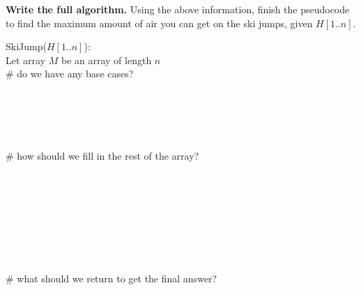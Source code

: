 \documentclass[11pt]{article}
\begin{document}
\begin{enumerate}
\begin{enumerate}
    \textbf{Write the full algorithm.} Using the above information, finish the pseudocode
    to find the maximum amount of air you can get on the ski jumps,
    given $H[1..n]$.
    \begin{algo}
    SkiJump($H[1..n]$):\+\\
    Let array $M$ be an array of length $n$\\
    \# do we have any base cases?\\
    \\
    \\
    \\
    \\
    \\
    \# how should we fill in the rest of the array?\\
    \\
    \\
    \\
    \\
    \\
    \\
    \\
    \\
    \# what should we return to get the final answer?\\
    \\
    \\
    \\
    \hspace{5in}
    \end{algo}
\end{enumerate}
\end{enumerate}
\end{document}
